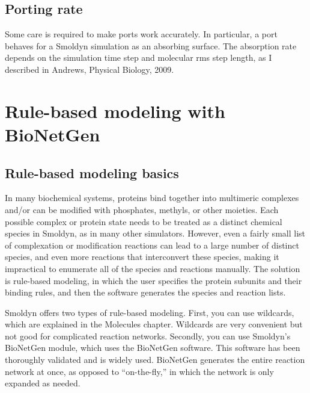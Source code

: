 \documentclass {scrbook}
\begin{document}
\section{Porting rate}

Some care is required to make ports work accurately. In particular, a port behaves for a Smoldyn simulation as an absorbing surface. The absorption rate depends on the simulation time step and molecular rms step length, as I described in Andrews, Physical Biology, 2009.


\chapter{Rule-based modeling with BioNetGen}

\section{Rule-based modeling basics}

In many biochemical systems, proteins bind together into multimeric complexes and/or can be modified with phosphates, methyls, or other moieties. Each possible complex or protein state needs to be treated as a distinct chemical species in Smoldyn, as in many other simulators. However, even a fairly small list of complexation or modification reactions can lead to a large number of distinct species, and even more reactions that interconvert these species, making it impractical to enumerate all of the species and reactions manually. The solution is rule-based modeling, in which the user specifies the protein subunits and their binding rules, and then the software generates the species and reaction lists.

Smoldyn offers two types of rule-based modeling. First, you can use wildcards, which are explained in the Molecules chapter. Wildcards are very convenient but not good for complicated reaction networks. Secondly, you can use Smoldyn's BioNetGen module, which uses the BioNetGen software. This software has been thoroughly validated and is widely used. BioNetGen generates the entire reaction network at once, as opposed to ``on-the-fly,'' in which the network is only expanded as needed.
\end{document}
